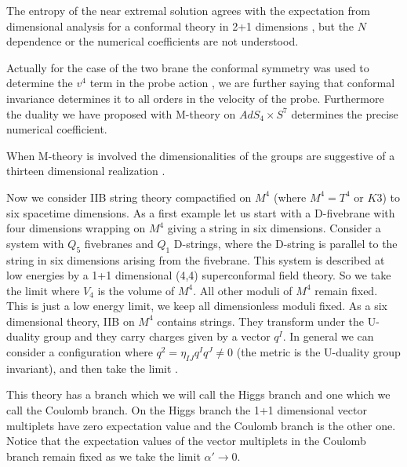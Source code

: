 The  entropy of the near extremal solution 
agrees with the expectation  
from dimensional analysis for a conformal theory in 2+1 dimensions \kt ,
but the $N$ dependence or the numerical coefficients are not understood. 


Actually for the case of the two brane the conformal  symmetry 
 was used to determine
the $v^4$ term in 
 the probe action \bfsse , we are further saying that conformal 
invariance determines it to all orders in the velocity of the  probe. 
Furthermore the duality we have proposed 
with M-theory on $AdS_4\times S^7$   determines
the precise numerical coefficient. 

When M-theory is involved the dimensionalities of the groups are
suggestive of a thirteen dimensional realization \bars . 




Now we consider IIB string theory compactified on $M^4$ (where $M^4 = T^4$
 or $K3$) to six 
spacetime dimensions. As a first example 
 let us start with  a D-fivebrane with four dimensions
wrapping on $M^4$ giving a string in six dimensions. Consider a system
with $Q_5$ fivebranes and $Q_1$ D-strings, where the D-string is parallel
to the  string in six dimensions arising from the fivebrane.  
This system is described at low energies by a 1+1 dimensional (4,4) 
superconformal field 
theory. 
So we  take the limit  
\eqn{}
where $V_4$ is the volume of $M^4$. All other moduli of $M^4$ remain fixed.
This is just a low energy limit, we keep all dimensionless moduli fixed. 
As a six dimensional theory, IIB on $M^4$ 
contains strings. They transform under the U-duality group and they
carry charges given by a vector $q^I$. In general we can 
consider a configuration
where $q^2 = \eta_{IJ} q^I q^J \not = 0$ (the metric is the U-duality  
group invariant), and then take the limit \lowenlim. 


This theory has a branch which we will call the Higgs branch and 
one which we call the Coulomb branch. On the Higgs branch  the 
1+1 dimensional vector multiplets have zero expectation value
and the Coulomb branch is the other one. Notice that 
 the expectation values of the vector multiplets in the
Coulomb branch remain  fixed as we take the limit $\alpha' \to 0$. 

